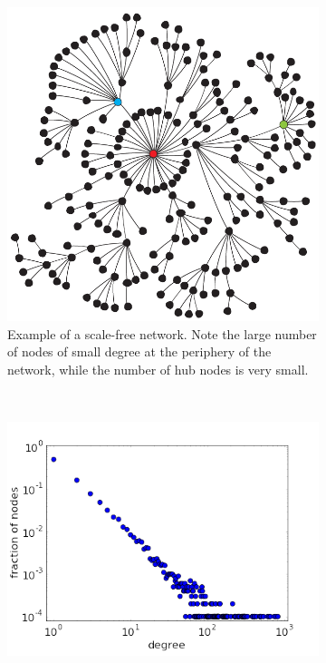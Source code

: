 \begin{figure}
  \centering
  \begin{subfigure}[b]{0.4\textwidth}
    \includegraphics[width=\textwidth]{images/scale-free-network.png}
    \caption[Scale free network]{Example of a scale-free network. Note the large
    number of nodes of small degree at the periphery of the network, while the
    number of hub nodes is very small.}
    \label{fig:scale_free_network}  
  \end{subfigure}
  ~ %
  \begin{subfigure}[b]{0.5\textwidth}
    \centering
    \includegraphics[width=\textwidth]{images/deg_dist_scale_free.png}

\end{subfigure}
\end{figure}
